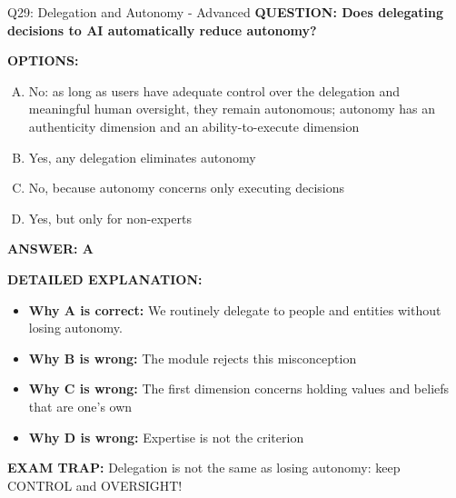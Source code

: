\documentclass[8pt]{beamer}
\begin{document}
\begin{frame}[shrink=6]{Q29: Delegation and Autonomy - Advanced}
\fontsize{6.5}{7.5}\selectfont
\textbf{QUESTION: Does delegating decisions to AI automatically reduce autonomy?}

\vspace{0.1cm}
\textbf{OPTIONS:}
\begin{enumerate}[A.]
\item No: as long as users have adequate control over the delegation and meaningful human oversight, they remain autonomous; autonomy has an authenticity dimension and an ability-to-execute dimension
\item Yes, any delegation eliminates autonomy
\item No, because autonomy concerns only executing decisions
\item Yes, but only for non-experts
\end{enumerate}

\vspace{0.1cm}
\textcolor{myblue}{\textbf{ANSWER: A}}

\vspace{0.1cm}
\textbf{DETAILED EXPLANATION:}
\begin{itemize}
\item \textbf{Why A is correct:} We routinely delegate to people and entities without losing autonomy.
\item \textbf{Why B is wrong:} The module rejects this misconception
\item \textbf{Why C is wrong:} The first dimension concerns holding values and beliefs that are one's own
\item \textbf{Why D is wrong:} Expertise is not the criterion
\end{itemize}

\textcolor{myred}{\textbf{EXAM TRAP:}} Delegation is not the same as losing autonomy: keep CONTROL and OVERSIGHT!
\end{frame}
\end{document}
